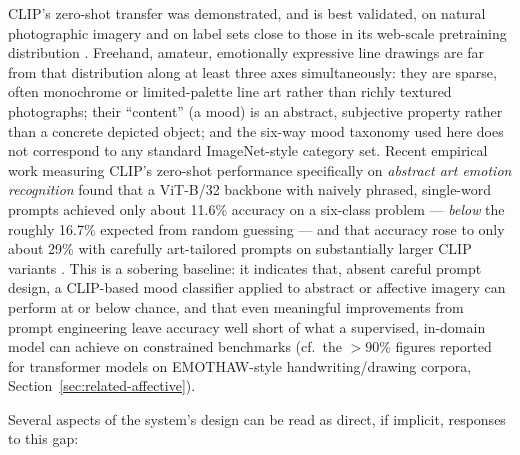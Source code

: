 \documentclass[10pt,twocolumn,letterpaper]{article}
\begin{document}
CLIP's zero-shot transfer was demonstrated, and is best validated, on natural photographic imagery and on label sets close to those in its web-scale pretraining distribution \cite{radford2021clip}. Freehand, amateur, emotionally expressive line drawings are far from that distribution along at least three axes simultaneously: they are sparse, often monochrome or limited-palette line art rather than richly textured photographs; their ``content'' (a mood) is an abstract, subjective property rather than a concrete depicted object; and the six-way mood taxonomy used here does not correspond to any standard ImageNet-style category set. Recent empirical work measuring CLIP's zero-shot performance specifically on \emph{abstract art emotion recognition} found that a ViT-B/32 backbone with naively phrased, single-word prompts achieved only about 11.6\% accuracy on a six-class problem --- \emph{below} the roughly 16.7\% expected from random guessing --- and that accuracy rose to only about 29\% with carefully art-tailored prompts on substantially larger CLIP variants \cite{conde2024affectiveart}. This is a sobering baseline: it indicates that, absent careful prompt design, a CLIP-based mood classifier applied to abstract or affective imagery can perform at or below chance, and that even meaningful improvements from prompt engineering leave accuracy well short of what a supervised, in-domain model can achieve on constrained benchmarks (cf.\ the $>90\%$ figures reported for transformer models on EMOTHAW-style handwriting/drawing corpora, Section~\ref{sec:related-affective}).

Several aspects of the system's design can be read as direct, if implicit, responses to this gap:
\end{document}
